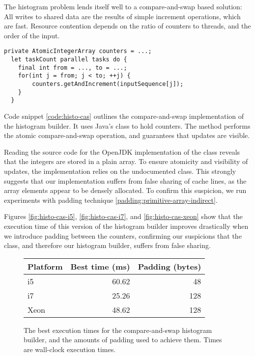 The histogram problem lends itself well to a compare-and-swap based solution:
All writes to shared data are the results of simple increment operations, which
are fast. Resource contention depends on the ratio of counters to threads, and the
order of the input.

\begin{code}
\begin{Verbatim}[frame=single]
  private AtomicIntegerArray counters = ...;
  let taskCount parallel tasks do {
    final int from = ..., to = ...;
    for(int j = from; j < to; ++j) {
        counters.getAndIncrement(inputSequence[j]);
    }
  }
\end{Verbatim}
	\caption{Simplified code for the threads in the compare-and-swap 
	version of the histogram builder.}
	\label{code:histo-cas}
\end{code}

Code snippet \ref{code:histo-cas} outlines the compare-and-swap implementation
of the histogram builder. It uses Java's  class to
hold counters. The  method performs the atomic compare-and-swap
operation, and guarantees that updates are visible.

Reading the source code for the OpenJDK implementation of the
 class \cite{atomicinterarraysrc} reveals that
the integers are stored in a plain  array.
To ensure atomicity and visibility of updates, the implementation relies on the
undocumented  class. This strongly suggests that our
implementation suffers from false sharing of cache lines, as the array elements
appear to be densely allocated. To confirm this suspicion, we run experiments with
padding technique \ref{padding:primitive-array-indirect}.

Figures \ref{fig:histo-cas-i5}, \ref{fig:histo-cas-i7}, and
\ref{fig:histo-cas-xeon} show that the execution time of this version of the
histogram builder improves drastically when we introduce padding between the
counters, confirming our suspicions that the  class,
and therefore our histogram builder, suffers from false sharing.

\begin{figure}[hbtp]
	\centering
	\begin{tabular}{l r r}
		\hline
		\hline
		Platform & Best time (ms) & Padding (bytes)\\
		\hline
		i5 & 60.62 & 48 \\
		i7 & 25.26 & 128 \\
		Xeon & 48.62 & 128 \\
		\hline
		\hline
	\end{tabular}
	\caption{The best execution times for the compare-and-swap histogram
	builder, and the amounts of padding used to achieve them. Times
	are wall-clock execution times.}
	\label{table:histo-cas}
\end{figure}

